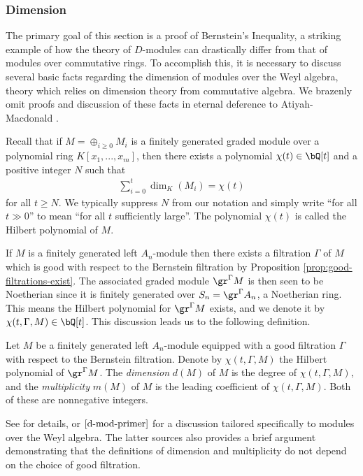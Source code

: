 \subsubsection{Dimension}
The primary goal of this section is a proof of Bernstein's Inequality, a striking example of how the theory of $D$-modules can drastically differ from that of modules over commutative rings. To accomplish this, it is necessary to discuss several basic facts regarding the dimension of modules over the Weyl algebra, theory which relies on dimension theory from commutative algebra. We brazenly omit proofs and discussion of these facts in eternal deference to Atiyah-Macdonald \cite{am}.

Recall that if $M = \oplus_{i \geq 0} M_i$ is a finitely generated graded module over a polynomial ring $K[x_1,...,x_m]$, then there exists a polynomial $\chi(t) \in \bQ[t]$ and a positive integer $N$ such that 
\begin{align*}
	\sum_{i = 0}^t \dim_K(M_i) = \chi(t)
\end{align*}
for all $t \geq N$. We typically suppress $N$ from our notation and simply write ``for all $t \gg 0$'' to mean ``for all $t$ sufficiently large''. The polynomial $\chi(t)$ is called the Hilbert polynomial of $M$.

If $M$ is a finitely generated left $A_n$-module then there exists a filtration $\Gamma$ of $M$ which is good with respect to the Bernstein filtration by Proposition \ref{prop:good-filtrations-exist}. The associated graded module $\gr^\Gamma M$ is then seen to be Noetherian since it is finitely generated over $S_n = \gr^\Gamma A_n$, a Noetherian ring. This means the Hilbert polynomial for $\gr^\Gamma M$ exists, and we denote it by $\chi(t,\Gamma,M) \in \bQ[t]$. This discussion leads us to the following definition.
\begin{defn}\label{defn:dimension-multiplicity}
	Let $M$ be a finitely generated left $A_n$-module equipped with a good filtration $\Gamma$ with respect to the Bernstein filtration. Denote by $\chi(t,\Gamma,M)$ the Hilbert polynomial of $\gr^\Gamma M$. The \emph{dimension} $d(M)$ of $M$ is the degree of $\chi(t,\Gamma,M)$, and the \emph{multiplicity} $m(M)$ of $M$ is the leading coefficient of $\chi(t,\Gamma,M)$. Both of these are nonnegative integers.
\end{defn}
See \cite{am} for details, or $\cite[Chapter 9]{d-mod-primer}$ for a discussion tailored specifically to modules over the Weyl algebra. The latter sources also provides a brief argument demonstrating that the definitions of dimension and multiplicity do not depend on the choice of good filtration.

